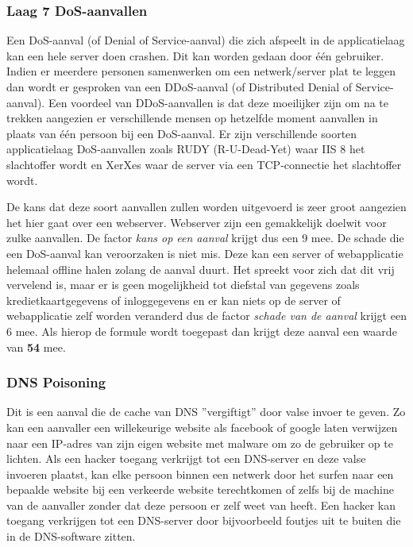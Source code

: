 \documentclass[pdftex,a4paper,12pt]{report}
\begin{document}
\subsubsection{Laag 7 DoS-aanvallen}
Een DoS-aanval (of Denial of Service-aanval) die zich afspeelt in de applicatielaag kan een hele server doen crashen. Dit kan worden gedaan door één gebruiker. Indien er meerdere personen samenwerken om een netwerk/server plat te leggen dan wordt er gesproken van een DDoS-aanval (of Distributed Denial of Service-aanval). Een voordeel van DDoS-aanvallen is dat deze moeilijker zijn om na te trekken aangezien er verschillende mensen op hetzelfde moment aanvallen in plaats van één persoon bij een DoS-aanval. \citep{Blagov2014} Er zijn verschillende soorten applicatielaag DoS-aanvallen zoals RUDY (R-U-Dead-Yet) waar IIS 8 het slachtoffer wordt en XerXes waar de server via een TCP-connectie het slachtoffer wordt. \newline

De kans dat deze soort aanvallen zullen worden uitgevoerd is zeer groot aangezien het hier gaat over een webserver. Webserver zijn een gemakkelijk doelwit voor zulke aanvallen. De factor \textit{kans op een aanval} krijgt dus een 9 mee. De schade die een DoS-aanval kan veroorzaken is niet mis.  Deze kan een server of webapplicatie helemaal offline halen zolang de aanval duurt. Het spreekt voor zich dat dit vrij vervelend is, maar er is geen mogelijkheid tot diefstal van gegevens zoals kredietkaartgegevens of inloggegevens en er kan niets op de server of webapplicatie zelf worden veranderd dus de factor \textit{schade van de aanval} krijgt een 6 mee. Als hierop de formule wordt toegepast dan krijgt deze aanval een waarde van \textbf{54} mee.

\subsubsection{DNS Poisoning}
Dit is een aanval die de cache van DNS ''vergiftigt'' door valse invoer te geven. Zo kan een aanvaller een willekeurige website als facebook of google laten verwijzen naar een IP-adres van zijn eigen website met malware om zo de gebruiker op te lichten. Als een hacker toegang verkrijgt tot een DNS-server en deze valse invoeren plaatst, kan elke persoon binnen een netwerk door het surfen naar een bepaalde website bij een verkeerde website terechtkomen of zelfs bij de machine van de aanvaller zonder dat deze persoon er zelf weet van heeft. Een hacker kan toegang verkrijgen tot een DNS-server door bijvoorbeeld foutjes uit te buiten die in de DNS-software zitten. \citep{Hoffm2015} \newline
\end{document}
